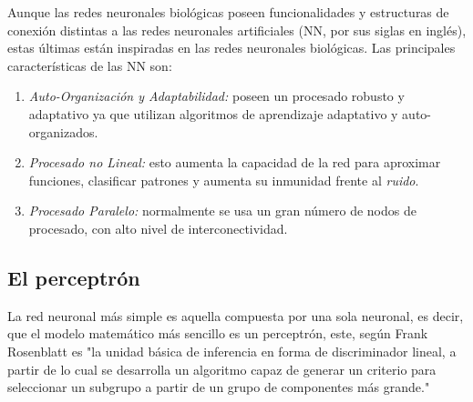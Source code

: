 \documentclass[12pt,letterpaper,oneside,openright]{book}
\begin{document}
	Aunque las redes neuronales biológicas poseen funcionalidades y estructuras de conexión distintas a las redes neuronales artificiales (NN, por sus siglas en inglés), estas últimas están inspiradas en las redes neuronales biológicas. Las principales características de las NN son:
	\begin{enumerate}
		\item \textit{Auto-Organización y Adaptabilidad:} poseen un procesado robusto y adaptativo ya que utilizan algoritmos de aprendizaje adaptativo y auto-organizados.
		\item \textit{Procesado no Lineal:} esto aumenta la capacidad de la red para aproximar funciones, clasificar patrones y aumenta su inmunidad frente al \textit{ruido}.
		\item \textit{Procesado Paralelo:} normalmente se usa un gran número de nodos de procesado, con alto nivel de interconectividad.
	\end{enumerate}
	\subsection{El perceptrón}
	La red neuronal más simple es aquella compuesta por una sola neuronal, es decir, que el modelo matemático más sencillo es un perceptrón, este, según Frank Rosenblatt \cite{perceptron} es "la unidad básica de inferencia en forma de discriminador lineal, a partir de lo cual se desarrolla un algoritmo capaz de generar un criterio para seleccionar un subgrupo a partir de un grupo de componentes más grande."
\end{document}
